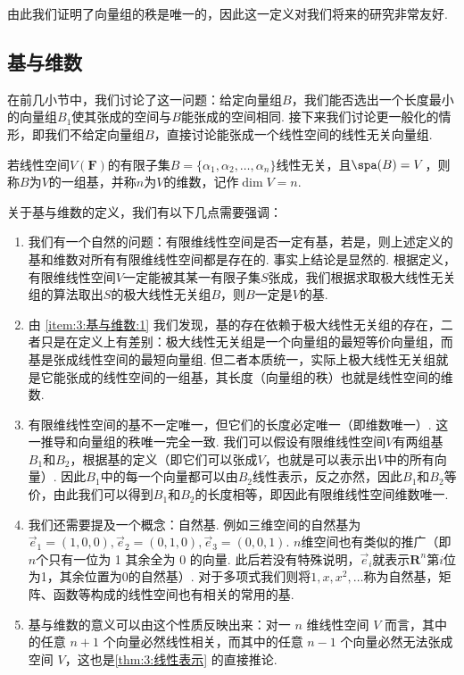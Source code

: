 由此我们证明了向量组的秩是唯一的，因此这一定义对我们将来的研究非常友好.

\subsection{基与维数}

在前几小节中，我们讨论了这一问题：给定向量组$B$，我们能否选出一个长度最小的向量组$B_1$使其张成的空间与$B$能张成的空间相同. 接下来我们讨论更一般化的情形，即我们不给定向量组$B$，直接讨论能张成一个线性空间的线性无关向量组.
\begin{definition}
    若线性空间$V(\mathbf{F})$的有限子集$B=\{\alpha_1,\alpha_2,\ldots,\alpha_n\}$线性无关，且$\spa(B) = V$，则称$B$为$V$的一组基，并称$n$为$V$的维数，记作$\dim V = n$.
\end{definition}

关于基与维数的定义，我们有以下几点需要强调：
\begin{enumerate}
    \item \label{item:3:基与维数:1}
          我们有一个自然的问题：有限维线性空间是否一定有基，若是，则上述定义的基和维数对所有有限维线性空间都是存在的. 事实上结论是显然的. 根据定义，有限维线性空间$V$一定能被其某一有限子集$S$张成，我们根据求取极大线性无关组的算法取出$S$的极大线性无关组$B$，则$B$一定是$V$的基.

    \item 由 \ref*{item:3:基与维数:1} 我们发现，基的存在依赖于极大线性无关组的存在，二者只是在定义上有差别：极大线性无关组是一个向量组的最短等价向量组，而基是张成线性空间的最短向量组. 但二者本质统一，实际上极大线性无关组就是它能张成的线性空间的一组基，其长度（向量组的秩）也就是线性空间的维数.

    \item 有限维线性空间的基不一定唯一，但它们的长度必定唯一（即维数唯一）. 这一推导和向量组的秩唯一完全一致. 我们可以假设有限维线性空间$V$有两组基$B_1$和$B_2$，根据基的定义（即它们可以张成$V$，也就是可以表示出$V$中的所有向量）. 因此$B_1$中的每一个向量都可以由$B_2$线性表示，反之亦然，因此$B_1$和$B_2$等价，由此我们可以得到$B_1$和$B_2$的长度相等，即因此有限维线性空间维数唯一.

    \item 我们还需要提及一个概念：自然基. 例如三维空间的自然基为$\vec{e}_1=(1,0,0),\vec{e}_2=(0,1,0),\vec{e}_3=(0,0,1)$. $n$维空间也有类似的推广（即$n$个只有一位为 1 其余全为 0 的向量. 此后若没有特殊说明，$\vec{e}_i$就表示$\mathbf{R}^n$第$i$位为1，其余位置为0的自然基）. 对于多项式我们则将$1,x,x^2,\ldots$称为自然基，矩阵、函数等构成的线性空间也有相关的常用的基.

    \item \label{item:3:基与维数:5}
          基与维数的意义可以由这个性质反映出来：对一 $n$ 维线性空间 $V$ 而言，其中的任意 $n + 1$ 个向量必然线性相关，而其中的任意 $n - 1$ 个向量必然无法张成空间 $V$，这也是\autoref{thm:3:线性表示} 的直接推论.
\end{enumerate}

